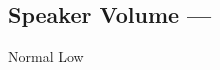 \subsection[Speaker Volume]{Speaker Volume --- \UiKey{\SET}}









































Normal
Low
